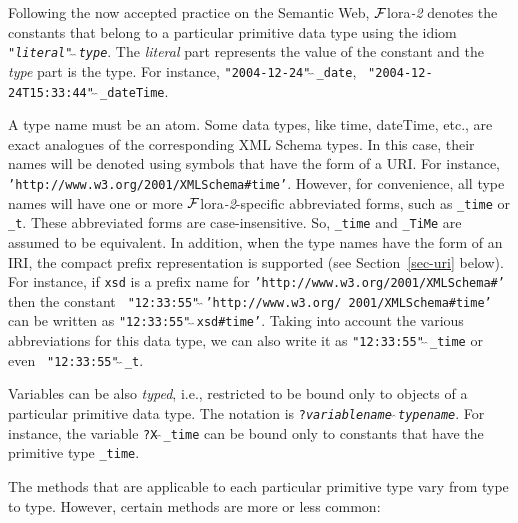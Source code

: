 \documentclass[11pt]{article}
\newcommand{\FLORA}{{\mbox{\sc ${\cal F}${lora}\rm\emph{-2}}}\xspace}
\begin{document}
Following the now accepted practice on the Semantic Web, \FLORA denotes the
constants that belong to a particular primitive data type using the idiom
{\tt "\emph{literal}"$\hat{~}\hat{~}$\emph{type}}. The \emph{literal} part
represents the value of the constant and the \emph{type} part is the
type. For instance, {\tt "2004-12-24"$\hat{~}\hat{~}$\_date}, {\tt
  "2004-12-24T15:33:44"$\hat{~}\hat{~}$\_dateTime}.

A type name must be an atom.
Some data types, like time, dateTime, etc., are exact analogues of the
corresponding XML Schema types. In this case, their names will be denoted
using symbols that have the form of a URI. For instance,
{\tt 'http://www.w3.org/2001/XMLSchema\#time'}.  However, for convenience,
all type names will have one or more \FLORA-specific abbreviated forms, such as
{\tt \_time} or {\tt \_t}. These abbreviated forms are
case-insensitive. So, {\tt \_time} and
{\tt \_TiMe} are assumed to be equivalent. In addition, when the type names have
the form of an IRI, the compact prefix representation is supported (see
Section~\ref{sec-uri} below). For
instance, if {\tt xsd}  is a prefix name for
{\tt 'http://www.w3.org/2001/XMLSchema\#'} 
then the constant {\tt
  "12:33:55"$\hat{~}\hat{~}$'http://www.w3.org/ 2001/XMLSchema\#time'}  can be written as
{\tt "12:33:55"$\hat{~}\hat{~}$xsd\#time'}. Taking into account the
various abbreviations for this data type, we can also write it as
{\tt "12:33:55"$\hat{~}\hat{~}$\_time} or even {\tt
  "12:33:55"$\hat{~}\hat{~}$\_t}.

Variables can be also \emph{typed}, i.e., restricted to be bound only to 
objects of a particular primitive data type. The notation is
{\tt ?\emph{variablename}$\hat{~}\hat{~}$\emph{typename}}. 
For instance, the variable {\tt ?X$\hat{~}\hat{~}$\_time}  
can be bound only to constants that have the primitive type {\tt \_time}. 

The methods that are applicable to each particular primitive type vary from
type to type. However, certain methods are more or less common:
\end{document}
